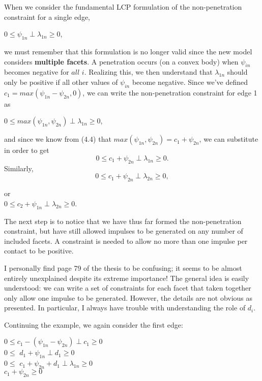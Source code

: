 \documentclass{article}
\begin{document}
When we consider the fundamental LCP formulation of the non-penetration constraint for a single edge,
\begin{center}$ 0 \leq \psi_{1n} \perp \lambda_{1n} \geq 0 $, \end{center}
we must remember that this formulation is no longer valid since the new model considers \textbf{multiple facets}.  A penetration occurs (on a convex body) when $\psi_{in}$ becomes negative for $all$ $i$.  Realizing this, we then understand that $\lambda_{1n}$ should only be positive if all other values of $\psi_{in}$ become negative.  Since we've defined $c_1 = max(\psi_{1n} - \psi_{2n},0)$, we can write the non-penetration constraint for edge 1 as 
\begin{center}$0 \leq max(\psi_{1n}, \psi_{2n}) \perp \lambda_{1n} \geq 0$, \end{center}
and since we know from (4.4) that $max(\psi_{1n}, \psi_{2n}) = c_1 + \psi_{2n}$, we can substitute in order to get
\begin{equation} 0 \leq c_1 + \psi_{2n} \perp \lambda_{1n} \geq 0.  \tag{4.7}  \end{equation}
Similarly,
\begin{equation} 0 \leq c_1 + \psi_{2n} \perp \lambda_{2n} \geq 0,  \tag{4.8}  \end{equation}
\begin{center} or \\$0 \leq c_2 + \psi_{1n} \perp \lambda_{2n} \geq 0$. \end{center}
The next step is to notice that we have thus far formed the non-penetration constraint, but have still allowed impulses to be generated on any number of included facets.  A constraint is needed to allow no more than one impulse per contact to be positive.  



I personally find page 79 of the thesis to be confusing; it seems to be almost entirely unexplained despite its extreme importance!  The general idea is easily understood: we can write a set of constraints for each facet that taken together only allow one impulse to be generated.  However, the details are not obvious as presented.  In particular, I always have trouble with understanding the role of $d_i$.  

Continuing the example, we again consider the first edge:  

\begin{center}
$ 0 \leq c_1 - (\psi_{1n} - \psi_{2n}) \perp c_1 \geq 0 $ \\
$ 0 \leq$ \hspace{12mm}$ d_1 + \psi_{1n} \perp d_1 \geq 0 $  \\
$0 \leq$ \hspace{1mm} $c_1 + \psi_{2n} + d_1 \perp \lambda_{1n} \geq 0 $ \\
$ c_1 + \psi_{2n} \geq 0 $
\end{center}
\end{document}
